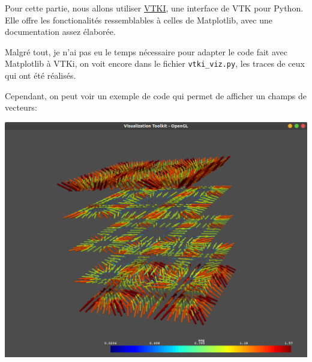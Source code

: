 \documentclass[11pt]{article}
\makeatletter
\def\maxwidth{\ifdim\Gin@nat@width>\linewidth\linewidth
    \else\Gin@nat@width\fi}
\let\Oldincludegraphics\includegraphics
\renewcommand{\includegraphics}[1]{\Oldincludegraphics[width=.8\maxwidth]{#1}}
\makeatother
\begin{document}
Pour cette partie, nous allons utiliser
\href{https://github.com/vtkiorg/vtki}{VTKI}, une interface de VTK pour
Python. Elle offre les fonctionalités ressemblables à celles de
Matplotlib, avec une documentation assez élaborée.

Malgré tout, je n'ai pas eu le temps nécessaire pour adapter le code
fait avec Matplotlib à VTKi, on voit encore dans le fichier
\texttt{vtki\_viz.py}, les traces de ceux qui ont été réalisés.

Cependant, on peut voir un exemple de code qui permet de afficher un
champs de vecteurs:

\includegraphics{docs/vtk_glyphes.png}
\end{document}
